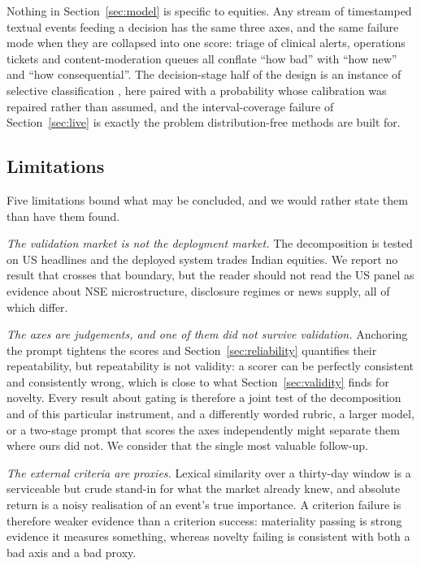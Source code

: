 Nothing in Section~\ref{sec:model} is specific to equities. Any stream of
timestamped textual events feeding a decision has the same three axes, and the
same failure mode when they are collapsed into one score: triage of clinical
alerts, operations tickets and content-moderation queues all conflate ``how bad''
with ``how new'' and ``how consequential''. The decision-stage half of the design
is an instance of selective classification \citep{chow1970,geifman2017}, here
paired with a probability whose calibration was repaired rather than assumed, and
the interval-coverage failure of Section~\ref{sec:live} is exactly the problem
distribution-free methods \citep{angelopoulos2023} are built for.

\subsection{Limitations}\label{sec:limits}

Five limitations bound what may be concluded, and we would rather state them than
have them found.

\emph{The validation market is not the deployment market.} The decomposition is
tested on US headlines and the deployed system trades Indian equities. We report
no result that crosses that boundary, but the reader should not read the US panel
as evidence about NSE microstructure, disclosure regimes or news supply, all of
which differ.

\emph{The axes are judgements, and one of them did not survive validation.}
Anchoring the prompt tightens the scores and Section~\ref{sec:reliability}
quantifies their repeatability, but repeatability is not validity: a scorer can be
perfectly consistent and consistently wrong, which is close to what
Section~\ref{sec:validity} finds for novelty. Every result about gating is
therefore a joint test of the decomposition and of this particular instrument, and
a differently worded rubric, a larger model, or a two-stage prompt that scores the
axes independently might separate them where ours did not. We consider that the
single most valuable follow-up.

\emph{The external criteria are proxies.} Lexical similarity over a thirty-day
window is a serviceable but crude stand-in for what the market already knew, and
absolute return is a noisy realisation of an event's true importance. A criterion
failure is therefore weaker evidence than a criterion success: materiality passing
is strong evidence it measures something, whereas novelty failing is consistent
with both a bad axis and a bad proxy.

